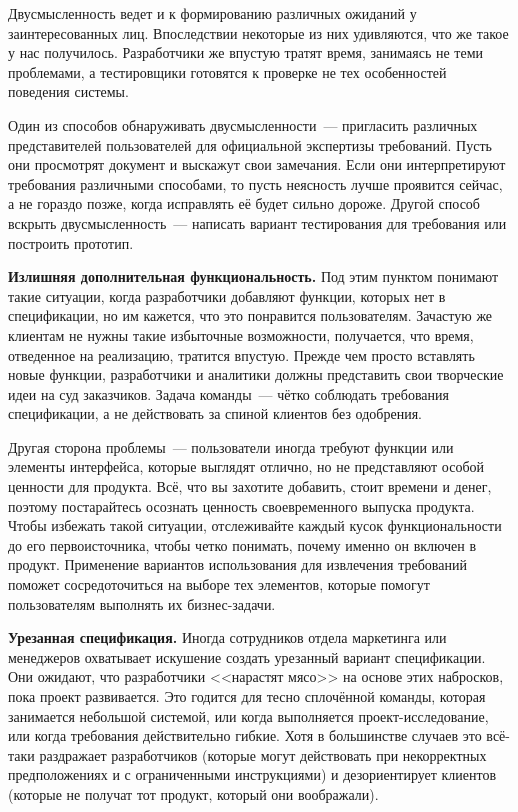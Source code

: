 \documentclass{../../text-style}
\begin{document}
Двусмысленность ведет и к формированию различных ожиданий у заинтересованных лиц. Впоследствии некоторые из них удивляются, что же такое у нас получилось. Разработчики же впустую тратят время, занимаясь не теми проблемами, а тестировщики готовятся к проверке не тех особенностей поведения системы.

Один из способов обнаруживать двусмысленности~--- пригласить различных представителей пользователей для официальной экспертизы требований. Пусть они просмотрят документ и выскажут свои замечания. Если они интерпретируют требования различными способами, то пусть неясность лучше проявится сейчас, а не гораздо позже, когда исправлять её будет сильно дороже. Другой способ вскрыть двусмысленность~--- написать вариант тестирования для требования или построить прототип.

\textbf{Излишняя дополнительная функциональность.} Под этим пунктом понимают такие ситуации, когда разработчики добавляют функции, которых нет в спецификации, но им кажется, что это понравится пользователям. Зачастую же клиентам не нужны такие избыточные возможности, получается, что время, отведенное на реализацию, тратится впустую. Прежде чем просто вставлять новые функции, разработчики и аналитики должны представить свои творческие идеи на суд заказчиков. Задача команды~--- чётко соблюдать требования спецификации, а не действовать за спиной клиентов без одобрения.

Другая сторона проблемы~--- пользователи иногда требуют функции или элементы интерфейса, которые выглядят отлично, но не представляют особой ценности для продукта. Всё, что вы захотите добавить, стоит времени и денег, поэтому постарайтесь осознать ценность своевременного выпуска продукта. Чтобы избежать такой ситуации, отслеживайте каждый кусок функциональности до его первоисточника, чтобы четко понимать, почему именно он включен в продукт. Применение вариантов использования для извлечения требований поможет сосредоточиться на выборе тех элементов, которые помогут пользователям выполнять их бизнес-задачи.

\textbf{Урезанная спецификация.} Иногда сотрудников отдела маркетинга или менеджеров охватывает искушение создать урезанный вариант спецификации. Они ожидают, что разработчики <<нарастят мясо>> на основе этих набросков, пока проект развивается. Это годится для тесно сплочённой команды, которая занимается небольшой системой, или когда выполняется проект-исследование, или когда требования действительно гибкие. Хотя в большинстве случаев это всё-таки раздражает разработчиков (которые могут действовать при некорректных предположениях и с ограниченными инструкциями) и дезориентирует клиентов (которые не получат тот продукт, который они воображали).
\end{document}
